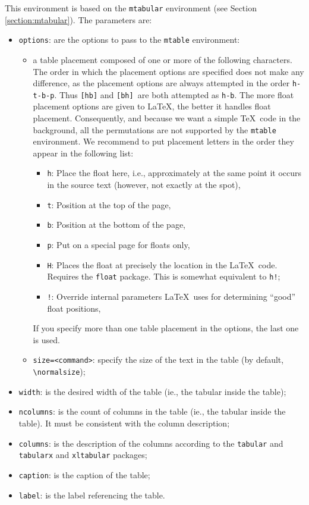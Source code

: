 \documentclass[book,taskpackage,specpackage,codepackage]{upmethodology-document}
\begin{document}
This environment is based on the \texttt{mtabular} environment (see Section \ref{section:mtabular}). The parameters are:
\begin{itemize}
\item \texttt{options}: are the options to pass to the \texttt{mtable} environment: \begin{itemize}
		\item a table placement composed of one or more of the following characters. The order in which the placement options are specified does not make any difference, as the placement options are always attempted in the order \texttt{h-t-b-p}. Thus \texttt{[hb]} and \texttt{[bh] }are both attempted as \texttt{h-b}. The more float placement options are given to \LaTeX, the better it handles float placement. Consequently, and because we want a simple \TeX\ code in the background, all the permutations are not supported by the \texttt{mtable} environment. We recommend to put placement letters in the order they appear in the following list: \begin{itemize}
		
			\item \texttt{h}: Place the float here, i.e., approximately at the same point it occurs in the source text (however, not exactly at the spot),
			\item \texttt{t}: Position at the top of the page,
			\item \texttt{b}: Position at the bottom of the page,
			\item \texttt{p}: Put on a special page for floats only,
			\item \texttt{H}: Places the float at precisely the location in the \LaTeX\ code. Requires the \texttt{float} package. This is somewhat equivalent to \texttt{h!};
			\item \texttt{!}: Override internal parameters \LaTeX\ uses for determining ``good'' float positions,
		\end{itemize}
		If you specify more than one table placement in the options, the last one is used.
		\item \texttt{size=\string<command\string>}: specify the size of the text in the table (by default, \texttt{{\textbackslash}normalsize});
	\end{itemize}
\item \texttt{width}: is the desired width of the table (ie., the tabular inside the table);
\item \texttt{ncolumns}: is the count of columns in the table (ie., the tabular inside the table). It must be consistent with the column description;
\item \texttt{columns}: is the description of the columns according to the \texttt{tabular} and \texttt{tabularx} and \texttt{xltabular} packages;
\item \texttt{caption}: is the caption of the table;
\item \texttt{label}: is the label referencing the table.
\end{itemize}
\end{document}
